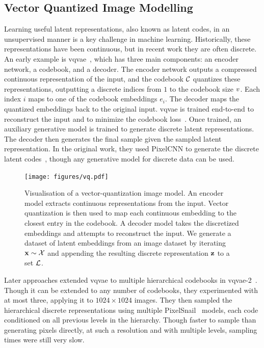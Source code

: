 \subsection{Vector Quantized Image Modelling}
\label{subsec:vqmodelling}

Learning useful latent representations, also known as latent codes, in an
unsupervised manner is a key challenge in machine learning. Historically, these
representations have been continuous, but in recent work they are often
discrete. An early example is \gls{vqvae}~\cite{oord2017vqvae}, which has three
main components: an encoder network, a codebook, and a decoder. The encoder
network outputs a compressed continuous representation of the input, and the
codebook $\mathcal{C}$ quantizes these representations, outputting a discrete
indices from $1$ to the codebook size $v$. Each index $i$ maps to
one of the codebook embeddings $e_i$. The decoder maps the quantized embeddings
back to the original input. \Gls{vqvae} is trained end-to-end to reconstruct the
input and to minimize the codebook loss~\cite{oord2017vqvae}. Once trained, an
auxiliary generative model is trained to generate discrete latent
representations. The decoder then generates the final sample given the sampled
latent representation. In the original work, they used PixelCNN to generate the
discrete latent codes~\cite{oord2017vqvae}, though any generative model for
discrete data can be used.

\begin{figure}[ht!]
    \centering
    \texttt{[image: figures/vq.pdf]}
    \caption{
        Visualisation of a vector-quantization image model. An encoder model
        extracts continuous representations from the input. Vector
        quantization is then used to map each continuous embedding to the
        closest entry in the codebook. A decoder model takes the discretized
        embeddings and attempts to reconstruct the input. We 
        generate a dataset of latent embeddings from an image dataset 
        by iterating $\mathbf{x} \sim \mathcal{X}$ and appending the resulting
        discrete representation $\mathbf{z}$ to a set $\mathcal{L}$.
    }
    \label{fig:vq}
\end{figure}

Later approaches extended \gls{vqvae} to multiple hierarchical codebooks in
\acrshort{vqvae}-2~\cite{razavi2019generating}. Though it can be extended to any
number of codebooks, they experimented with at most three, applying it to $1024
\times 1024$ images. They then sampled the hierarchical discrete representations
using multiple PixelSnail~\cite{chen2017snail} models, each code conditioned on
all previous levels in the hierarchy. Though faster to sample than generating
pixels directly, at such a resolution and with multiple levels, sampling times
were still very slow.

